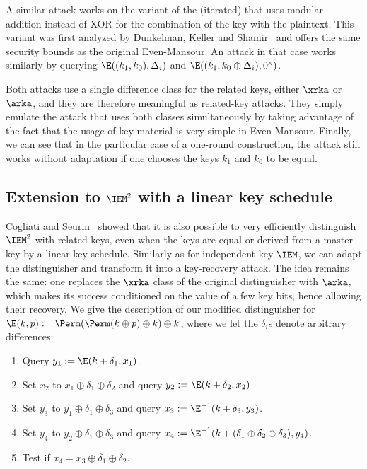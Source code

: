 A similar attack works on the variant of the (iterated) \EM
that uses modular addition instead of XOR for the combination of the key with the plaintext.
This variant was first analyzed by Dunkelman, Keller and Shamir~\cite{DKS12} and offers the same security bounds as the
original Even-Mansour. An attack in that case works similarly
by querying \eg $\E((k_1, k_0), \Delta_i)$ and
$\E((k_1, k_0 \oplus \Delta_i), 0^\kappa)$.

Both attacks use a single difference class for the related keys, either $\xrka$ or $\arka$,
and they are therefore meaningful as related-key attacks. They simply emulate the attack that uses both
classes simultaneously by taking advantage of the fact that the usage of key material is very simple in
Even-Mansour.
Finally, we can see that in the particular case of a one-round construction, the attack still works without
adaptation if one
chooses the keys $k_1$ and $k_0$ to be equal.

\subsection{Extension to $\IEM^2$ with a linear key schedule}

Cogliati and Seurin~\cite{CS15} showed that it is also possible to very efficiently distinguish
$\IEM^2$ with related keys, even when the keys are equal or derived
from a master key by a linear key schedule. Similarly as for independent-key $\IEM$, we can adapt
the distinguisher and transform it into a key-recovery attack. The idea remains the same: one
replaces the $\xrka$ class of the original distinguisher with $\arka$, which makes its success
conditioned on the value of a few key bits, hence allowing their recovery. We give
the description of our modified distinguisher for $\E(k, p) := \Perm(\Perm(k \oplus p) \oplus k) \oplus k$,
where we let the $\delta_i$s denote arbitrary differences:

\begin{enumerate}[leftmargin=4em]
	\item Query $y_1 := \E(k + \delta_1, x_1)$.
	\item Set $x_2$ to $x_1 \oplus \delta_1 \oplus \delta_2$ and query $y_2 := \E(k + \delta_2, x_2)$.
	\item Set $y_3$ to $y_1 \oplus \delta_1 \oplus \delta_3$ and query $x_3 := \E^{-1}(k + \delta_3, y_3)$.
	\item Set $y_4$  to $y_2 \oplus \delta_1 \oplus \delta_3$ and query $x_4 := \E^{-1}(k + (\delta_1 \oplus \delta_2 \oplus \delta_3), y_4)$.
	\item Test if $x_4 = x_3 \oplus \delta_1 \oplus \delta_2$.
\end{enumerate}

